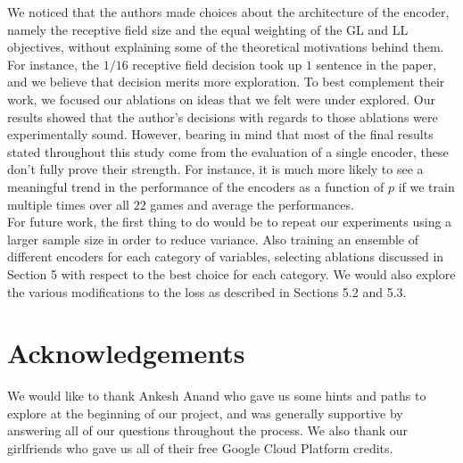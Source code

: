 We noticed that the authors made choices about the architecture of the encoder, namely the receptive field size and the equal weighting of the GL and LL objectives, without explaining some of the theoretical motivations behind them. For instance, the $1/16$ receptive field decision took up $1$ sentence in the paper, and we believe that decision merits more exploration. To best complement their work, we focused our ablations on ideas that we felt were under explored. Our results showed that the author's decisions with regards to those ablations were experimentally sound. However, bearing in mind that most of the final results stated throughout this study come from the evaluation of a single encoder, these don't fully prove their strength. For instance, it is much more likely to see a meaningful trend in the performance of the encoders as a function of $p$ if we train multiple times over all $22$ games and average the performances. \\

For future work, the first thing to do would be to repeat our experiments using a larger sample size in order to reduce variance. Also training an ensemble of different encoders for each category of variables, selecting ablations discussed in Section 5 with respect to the best choice for each category. We would also explore the various modifications to the loss as described in Sections 5.2 and 5.3.

\section{Acknowledgements}
We would like to thank Ankesh Anand who gave us some hints and paths to explore at the beginning of our project, and was generally supportive by answering all of our questions throughout the process. We also thank our girlfriends who gave us all of their free Google Cloud Platform credits.